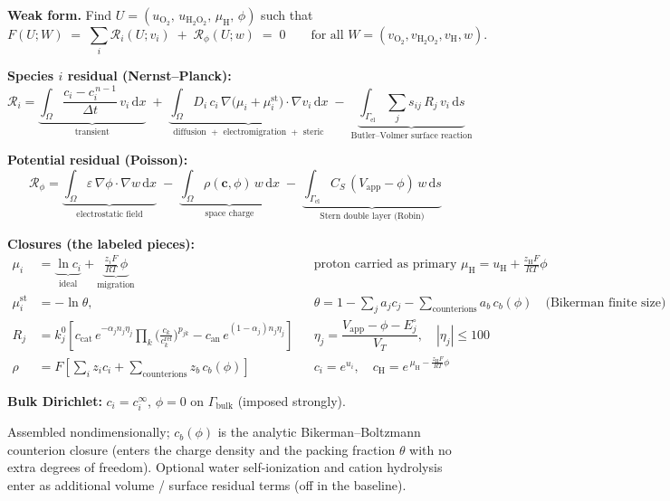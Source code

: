 \documentclass[border=14pt,varwidth=18cm]{standalone}
\newcommand{\dvol}{\,\mathrm{d}x}
\newcommand{\dsurf}{\,\mathrm{d}s}
\newcommand{\Gel}{\Gamma_{\mathrm{el}}}
\begin{document}
\small

\noindent\textbf{Weak form.}\;
Find $U=(u_{\mathrm{O_2}},\,u_{\mathrm{H_2O_2}},\,\mu_{\mathrm H},\,\phi)$ such that
\[
F(U;W)\;=\;\sum_{i}\mathcal{R}_i(U;v_i)\;+\;\mathcal{R}_\phi(U;w)\;=\;0
\qquad\text{for all }W=(v_{\mathrm{O_2}},v_{\mathrm{H_2O_2}},v_{\mathrm H},w).
\]

\noindent\textbf{Species $i$ residual (Nernst--Planck):}
\[
\mathcal{R}_i=
\underbrace{\int_\Omega \frac{c_i-c_i^{\,n-1}}{\Delta t}\,v_i\dvol}_{\text{transient}}
\;+\;
\underbrace{\int_\Omega D_i\,c_i\,\nabla\!\big(\mu_i+\mu_i^{\mathrm{st}}\big)\!\cdot\!\nabla v_i\dvol}_{\text{diffusion }+\text{ electromigration }+\text{ steric}}
\;-\;
\underbrace{\int_{\Gel}\sum_j s_{ij}\,R_j\,v_i\dsurf}_{\text{Butler--Volmer surface reaction}}
\]

\noindent\textbf{Potential residual (Poisson):}
\[
\mathcal{R}_\phi=
\underbrace{\int_\Omega \varepsilon\,\nabla\phi\!\cdot\!\nabla w\dvol}_{\text{electrostatic field}}
\;-\;
\underbrace{\int_\Omega \rho(\mathbf{c},\phi)\,w\dvol}_{\text{space charge}}
\;-\;
\underbrace{\int_{\Gel} C_S\,(V_{\mathrm{app}}-\phi)\,w\dsurf}_{\text{Stern double layer (Robin)}}
\]

\noindent\textbf{Closures (the labeled pieces):}
\begin{align*}
\mu_i &= \underbrace{\ln c_i}_{\text{ideal}}+\underbrace{\tfrac{z_i F}{RT}\,\phi}_{\text{migration}}
   && \text{proton carried as primary } \mu_{\mathrm H}=u_{\mathrm H}+\tfrac{z_{\mathrm H}F}{RT}\phi\\[2pt]
\mu_i^{\mathrm{st}} &= -\ln\theta, &&
   \theta=1-\sum_j a_j c_j-\!\!\sum_{\text{counterions}}\!\! a_b\,c_b(\phi)
   \quad\text{(Bikerman finite size)}\\[2pt]
R_j &= k^0_j\!\left[c_{\mathrm{cat}}\,e^{-\alpha_j n_j \eta_j}\!\!\prod_k\!\Big(\tfrac{c_k}{c_k^{\mathrm{ref}}}\Big)^{p_{jk}}
   \!-c_{\mathrm{an}}\,e^{(1-\alpha_j) n_j \eta_j}\right]
   && \eta_j=\dfrac{V_{\mathrm{app}}-\phi-E_j^{\circ}}{V_T},\quad |\eta_j|\le 100\\[2pt]
\rho &= F\!\left[\sum_i z_i c_i+\!\!\sum_{\text{counterions}}\!\! z_b\,c_b(\phi)\right]
   && c_i=e^{u_i},\quad c_{\mathrm H}=e^{\,\mu_{\mathrm H}-\frac{z_{\mathrm H}F}{RT}\phi}
\end{align*}

\noindent\textbf{Bulk Dirichlet:} $c_i=c_i^{\infty}$, $\phi=0$ on $\Gamma_{\mathrm{bulk}}$ (imposed strongly).

\smallskip
\footnotesize
Assembled nondimensionally; $c_b(\phi)$ is the analytic Bikerman--Boltzmann counterion closure (enters the charge density and the packing fraction $\theta$ with no extra degrees of freedom). Optional water self-ionization and cation hydrolysis enter as additional volume / surface residual terms (off in the baseline).
\end{document}
